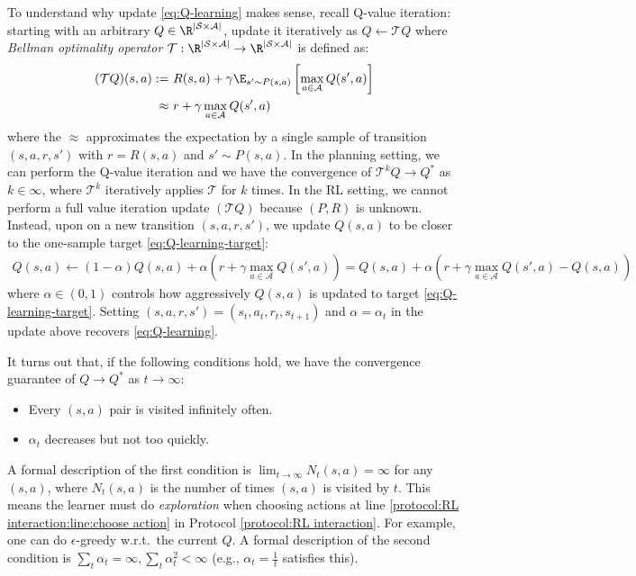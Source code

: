 To understand why update \eqref{eq:Q-learning} makes sense, recall Q-value iteration: starting with an arbitrary $Q\in\R^{|\mathcal{S}\times\mathcal{A}|}$, update it iteratively as $Q \gets \mathcal{T} Q$ where {\em Bellman optimality operator} $\mathcal{T}:\R^{|\mathcal{S}\times\mathcal{A}|}\to\R^{|\mathcal{S}\times\mathcal{A}|}$ is defined as:
\begin{align}
  (\mathcal{T}Q)(s,a) :=&~ R(s,a)+\gamma\E_{s'\sim P(s,a)}\left[\max_{a\in\mathcal{A}}Q(s',a)\right] \label{eq:Bellman_optimality_operator}\\ 
  \approx &~r+\gamma\max_{a\in\mathcal{A}}Q(s',a) \label{eq:Q-learning-target} 
\end{align}
where the $\approx$ approximates the expectation by a single sample of transition $(s,a,r,s')$ with $r=R(s,a)$ and $s'\sim P(s,a)$.
In the planning setting, we can perform the Q-value iteration and we have the convergence of $\mathcal{T}^kQ\to Q^*$ as $k\in\infty$, where $\mathcal{T}^k$ iteratively applies $\mathcal{T}$ for $k$ times.
In the RL setting, we cannot perform a full value iteration update $(\mathcal{T}Q)$ because $(P,R)$ is unknown. Instead, upon on a new transition $(s,a,r,s')$, we update $Q(s,a)$ to be closer to the one-sample target \eqref{eq:Q-learning-target}:
\begin{align*}
    Q(s,a) \gets (1-\alpha) Q(s,a) + \alpha \left(r+\gamma\max_{a\in\mathcal{A}}Q(s',a)\right)
    = Q(s,a) + \alpha\left(r+\gamma\max_{a\in\mathcal{A}}Q(s',a)-Q(s,a)\right)
\end{align*}
where $\alpha\in(0,1)$ controls how aggressively $Q(s,a)$ is updated to target \eqref{eq:Q-learning-target}.
Setting $(s,a,r,s')=(s_t,a_t,r_t,s_{t+1})$ and $\alpha=\alpha_t$ in the update above recovers \eqref{eq:Q-learning}.

It turns out that, if the following conditions hold, we have the convergence guarantee of $Q \to Q^*$ as $t\to\infty$:  \begin{itemize}
    \item Every $(s,a)$ pair is visited infinitely often.
    \item $\alpha_t$ decreases but not too quickly.
\end{itemize}
A formal description of the first condition is 
$\lim_{t\to\infty}N_t(s,a)=\infty$ for any $(s,a)$, where $N_t(s,a)$ is the number of times $(s,a)$ is visited by $t$.
This means the learner must do {\em exploration} when choosing actions at line \ref{protocol:RL interaction:line:choose action} in Protocol \ref{protocol:RL interaction}. For example, one can do $\epsilon$-greedy w.r.t.~the current $Q$. 
A formal description of the second condition is $\sum_t \alpha_t=\infty, \sum_t \alpha_t^2<\infty$ (e.g., $\alpha_t=\frac{1}{t}$ satisfies this).

